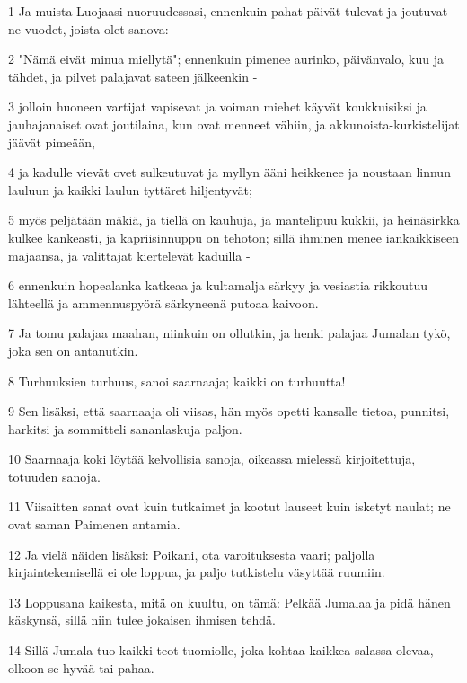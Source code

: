 \par 1 Ja muista Luojaasi nuoruudessasi, ennenkuin pahat päivät tulevat ja joutuvat ne vuodet, joista olet sanova:
\par 2 "Nämä eivät minua miellytä"; ennenkuin pimenee aurinko, päivänvalo, kuu ja tähdet, ja pilvet palajavat sateen jälkeenkin -
\par 3 jolloin huoneen vartijat vapisevat ja voiman miehet käyvät koukkuisiksi ja jauhajanaiset ovat joutilaina, kun ovat menneet vähiin, ja akkunoista-kurkistelijat jäävät pimeään,
\par 4 ja kadulle vievät ovet sulkeutuvat ja myllyn ääni heikkenee ja noustaan linnun lauluun ja kaikki laulun tyttäret hiljentyvät;
\par 5 myös peljätään mäkiä, ja tiellä on kauhuja, ja mantelipuu kukkii, ja heinäsirkka kulkee kankeasti, ja kapriisinnuppu on tehoton; sillä ihminen menee iankaikkiseen majaansa, ja valittajat kiertelevät kaduilla -
\par 6 ennenkuin hopealanka katkeaa ja kultamalja särkyy ja vesiastia rikkoutuu lähteellä ja ammennuspyörä särkyneenä putoaa kaivoon.
\par 7 Ja tomu palajaa maahan, niinkuin on ollutkin, ja henki palajaa Jumalan tykö, joka sen on antanutkin.
\par 8 Turhuuksien turhuus, sanoi saarnaaja; kaikki on turhuutta!
\par 9 Sen lisäksi, että saarnaaja oli viisas, hän myös opetti kansalle tietoa, punnitsi, harkitsi ja sommitteli sananlaskuja paljon.
\par 10 Saarnaaja koki löytää kelvollisia sanoja, oikeassa mielessä kirjoitettuja, totuuden sanoja.
\par 11 Viisaitten sanat ovat kuin tutkaimet ja kootut lauseet kuin isketyt naulat; ne ovat saman Paimenen antamia.
\par 12 Ja vielä näiden lisäksi: Poikani, ota varoituksesta vaari; paljolla kirjaintekemisellä ei ole loppua, ja paljo tutkistelu väsyttää ruumiin.
\par 13 Loppusana kaikesta, mitä on kuultu, on tämä: Pelkää Jumalaa ja pidä hänen käskynsä, sillä niin tulee jokaisen ihmisen tehdä.
\par 14 Sillä Jumala tuo kaikki teot tuomiolle, joka kohtaa kaikkea salassa olevaa, olkoon se hyvää tai pahaa.



